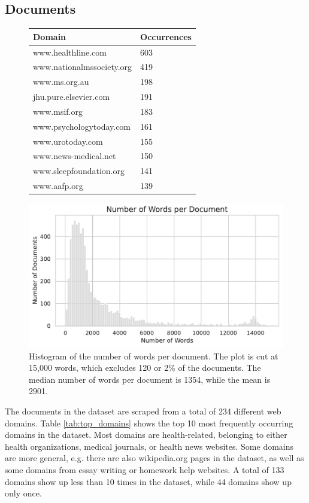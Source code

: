 \subsection{Documents}
\begin{figure}
\centering
   \begin{minipage}{\textwidth}
        \centering
        \begin{tabular}{ll}
        \hline
        \textbf{Domain} & \textbf{Occurrences} \\
        \hline
        www.healthline.com & 603 \\
        www.nationalmssociety.org & 419 \\
        www.ms.org.au & 198 \\
        jhu.pure.elsevier.com & 191 \\
        www.msif.org & 183 \\
        www.psychologytoday.com & 161 \\
        www.urotoday.com & 155 \\
        www.news-medical.net & 150 \\
        www.sleepfoundation.org & 141 \\
        www.aafp.org & 139 \\
        \hline
        \end{tabular}
        \label{tab:top_domains}
   \end{minipage} 
   \begin{minipage}{\textwidth}
        \includegraphics[width=\textwidth]{images/num_words_per_passage.pdf}
        \caption{Histogram of the number of words per document. The plot is cut at 15,000 words, which excludes 120 or 2\% of the documents. The median number of words per document is 1354, while the mean is 2901.}
        \label{fig:num_words_per_document}
   \end{minipage}
\end{figure}
The documents in the dataset are scraped from a total of 234 different web domains.
Table \ref{tab:top_domains} shows the top 10 most frequently occurring domains in the dataset.
Most domains are health-related, belonging to either health organizations, medical journals, or health news websites.
Some domains are more general, e.g. there are also wikipedia.org pages in the dataset, as well as some domains from essay writing or homework help websites.
A total of 133 domains show up less than 10 times in the dataset, while 44 domains show up only once.

